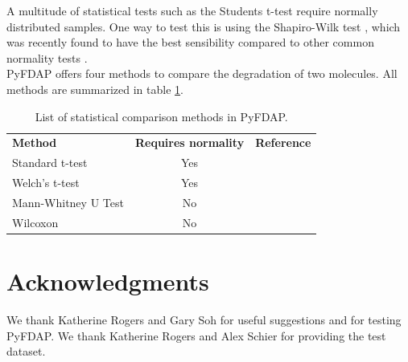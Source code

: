 \documentclass[a4paper,11pt]{article}
\begin{document}
A multitude of statistical tests such as the Students t-test \citep{Student1908} require normally distributed samples. One way to test this is using the Shapiro-Wilk test \citep{Shapiro1965}, which was recently
found to have the best sensibility compared to other common normality tests \citep{Razali2011}.\\

PyFDAP offers four methods to compare the degradation of two molecules. All methods are summarized in table \ref{tab:stats}.

\begin{table}
 \small
  \centering
 \begin{tabular}{p{4cm}|c|p{4cm}}
\textbf{Method} & \textbf{Requires normality} & \textbf{Reference} \\
\hhline{=|=|=}
\raggedright Standard t-test &\centering Yes & \cite{Student1908} \\
 \hline
\raggedright Welch's t-test &\centering Yes & \cite{Welch1947} \\
  \hline
\raggedright Mann-Whitney U Test  &\centering  No & \cite{MannWhitney1947} \\
 \hline
\raggedright Wilcoxon &\centering No & \cite{Wilcoxon1945} \\
 \hline
 \end{tabular}
\caption{List of statistical comparison methods in PyFDAP.}
\label{tab:stats}
\end{table}

\section{Acknowledgments}
We thank Katherine Rogers and Gary Soh for useful suggestions and for testing PyFDAP. We thank Katherine Rogers and Alex Schier for providing the test dataset.

\pagebreak
\end{document}
